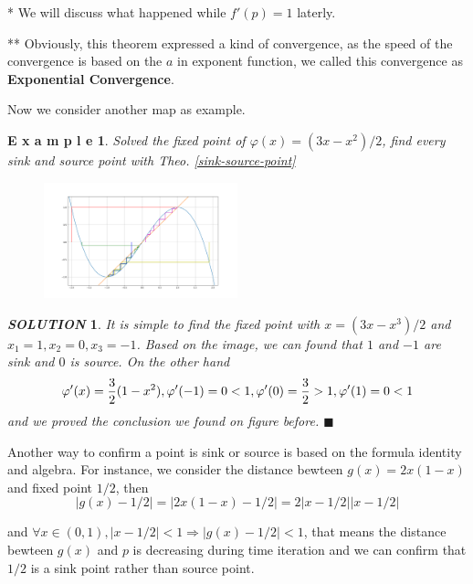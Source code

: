 \documentclass[12pt]{article}
\theoremstyle{plain}
\newtheorem{example}{\textbf{E x a m p l e}}[section]
\newtheorem{solution}{\textit{SOLUTION}}[section]
\begin{document}
* We will discuss what happened while $f'(p) = 1$ laterly.

** Obviously, this theorem expressed a kind of convergence, as the speed of the convergence is based on the $a$ in exponent function, we called this convergence as \textbf{Exponential Convergence}.

Now we consider another map as example.


\newpage
\begin{example} Solved the fixed point of $\varphi(x) = (3x -x^2)/2$, find every sink and source point with Theo. \ref{sink-source-point}
\end{example}


\begin{figure}[H]
\begin{center}
\includegraphics[width=0.5\textwidth]{figure/section1/cobweb-plot-2.png} \\
\end{center}
\end{figure}

{\color{blue}
\begin{solution}
It is simple to find the fixed point with $x = (3x - x^3) / 2$ and $x_1 = 1, x_2 = 0, x_3 = -1$. Based on the image, we can found that $1$ and $-1$ are sink and $0$ is source. On the other hand
$$
\varphi'(x) = {3\over 2} (1 - x^2), \varphi'(-1) = 0 < 1, \varphi'(0) = {3 \over 2} > 1, \varphi'(1) = 0 < 1
$$ 
and we proved the conclusion we found on figure before. $\blacksquare$
\end{solution}
}

Another way to confirm a point is sink or source is based on the formula identity and algebra. For instance, we consider the distance bewteen $g(x) = 2x(1-x)$ and fixed point $1/2$, then 
$$
|g(x) - 1/2| = |2x(1-x) - 1/2| = 2|x - 1/2||x - 1/2|
$$

and $\forall x \in (0, 1), |x - 1/2| < 1 \Rightarrow |g(x) - 1/2| < 1$, that means the distance bewteen $g(x)$ and $p$ is decreasing during time iteration and we can confirm that $1/2$ is a sink point rather than source point.
\end{document}
